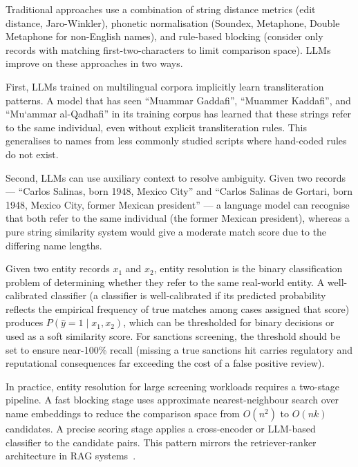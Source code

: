 Traditional approaches use a combination of string distance metrics (edit distance, Jaro-Winkler), phonetic normalisation (Soundex, Metaphone, Double Metaphone for non-English names), and rule-based blocking (consider only records with matching first-two-characters to limit comparison space). LLMs improve on these approaches in two ways.

First, LLMs trained on multilingual corpora implicitly learn transliteration patterns. A model that has seen ``Muammar Gaddafi'', ``Muammer Kaddafi'', and ``Mu\textquoteleft ammar al-Qadhafi'' in its training corpus has learned that these strings refer to the same individual, even without explicit transliteration rules. This generalises to names from less commonly studied scripts where hand-coded rules do not exist.

Second, LLMs can use auxiliary context to resolve ambiguity. Given two records --- ``Carlos Salinas, born 1948, Mexico City'' and ``Carlos Salinas de Gortari, born 1948, Mexico City, former Mexican president'' --- a language model can recognise that both refer to the same individual (the former Mexican president), whereas a pure string similarity system would give a moderate match score due to the differing name lengths.

\begin{definition}
\label{def:entity-resolution}
Given two entity records $x_1$ and $x_2$, entity resolution is the binary classification problem of determining whether they refer to the same real-world entity. A well-calibrated classifier (a classifier is well-calibrated if its predicted probability reflects the empirical frequency of true matches among cases assigned that score) produces $P(\hat{y} = 1 \mid x_1, x_2)$, which can be thresholded for binary decisions or used as a soft similarity score. For sanctions screening, the threshold should be set to ensure near-100\% recall (missing a true sanctions hit carries regulatory and reputational consequences far exceeding the cost of a false positive review).
\end{definition}

In practice, entity resolution for large screening workloads requires a two-stage pipeline. A fast blocking stage uses approximate nearest-neighbour search over name embeddings to reduce the comparison space from $O(n^2)$ to $O(nk)$ candidates. A precise scoring stage applies a cross-encoder or LLM-based classifier to the candidate pairs. This pattern mirrors the retriever-ranker architecture in RAG systems~\cite{gao2024retrieval}.

